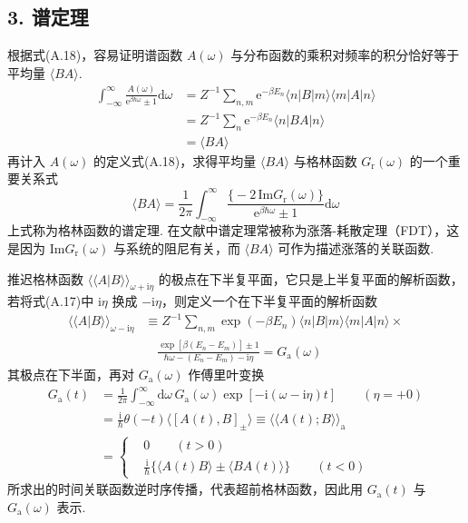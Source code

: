\subsection*{3. 谱定理}

根据式(A.18)，容易证明谱函数 $A(\omega)$ 与分布函数的乘积对频率的积分恰好等于平均量 $\langle BA\rangle$.
\begin{equation}
\begin{aligned}
\int_{-\infty}^{\infty}\frac{A(\omega)}
{\mathrm{e}^{\beta\hbar\omega}\pm1}\mathrm{d}\omega
&=Z^{-1}\sum_{n,m}\mathrm{e}^{-\beta E_{n}}\langle n|B|m\rangle
\langle m|A|n\rangle\\
&=Z^{-1}\sum_{n}\mathrm{e}^{-\beta E_{n}}\langle n|BA|n\rangle\\
&=\langle BA\rangle
\end{aligned}
\end{equation}
再计入 $A(\omega)$ 的定义式(A.18)，求得平均量 $\langle BA\rangle$ 与格林函数 $G_{\mathrm{r}}(\omega)$ 的一个重要关系式
\begin{equation}
\langle BA\rangle=\frac{1}{2\pi}\int_{-\infty}^{\infty}
\frac{\bigl\{-2\,\mathrm{Im}G_{\mathrm{r}}(\omega)\bigr\}}
{\mathrm{e}^{\beta\hbar\omega}\pm1}\mathrm{d}\omega
\end{equation}
上式称为格林函数的谱定理. 在文献中谱定理常被称为涨落-耗散定理（FDT），这是因为 $\mathrm{Im}G_{\mathrm{r}}(\omega)$ 与系统的阻尼有关，而 $\langle BA\rangle$ 可作为描述涨落的关联函数.

推迟格林函数 $\langle\langle A|B\rangle\rangle_{\omega+\mathrm{i}\eta}$ 的极点在下半复平面，它只是上半复平面的解析函数，若将式(A.17)中 $\mathrm{i}\eta$ 换成 $-\mathrm{i}\eta$，则定义一个在下半复平面的解析函数
\begin{equation}
\begin{aligned}
\langle\langle A|B\rangle\rangle_{\omega-\mathrm{i}\eta}
&\equiv Z^{-1}\sum_{n,m}\exp(-\beta E_{n})\langle n|B|m\rangle
\langle m|A|n\rangle\times\\
&\quad\frac{\exp[\beta(E_{n}-E_{m})]\pm1}
{\hbar\omega-(E_{n}-E_{m})-\mathrm{i}\eta}=G_{\mathrm{a}}(\omega)
\end{aligned}
\end{equation}
其极点在下半面，再对 $G_{\mathrm{a}}(\omega)$ 作傅里叶变换
\begin{equation}
\begin{aligned}
G_{\mathrm{a}}(t)&=\frac{1}{2\pi}\int_{-\infty}^{\infty}
\mathrm{d}\omega\,G_{\mathrm{a}}(\omega)
\exp[-\mathrm{i}(\omega-\mathrm{i}\eta)t]\qquad(\eta=+0)\\
&=\frac{\mathrm{i}}{\hbar}\theta(-t)\langle[A(t),B]_{\pm}\rangle
\equiv\langle\langle A(t);B\rangle\rangle_{\mathrm{a}}\\
&=\left\{
\begin{aligned}
&0\qquad(t>0)\\
&\frac{\mathrm{i}}{\hbar}\bigl\{\langle A(t)B\rangle
\pm\langle BA(t)\rangle\bigr\}\qquad(t<0)
\end{aligned}\right.
\end{aligned}
\end{equation}
所求出的时间关联函数逆时序传播，代表超前格林函数，因此用 $G_{\mathrm{a}}(t)$ 与 $G_{\mathrm{a}}(\omega)$ 表示.

